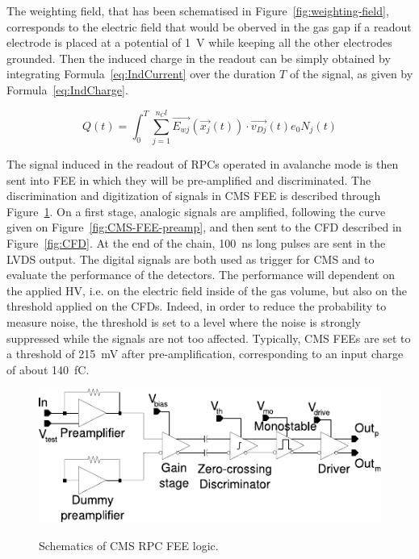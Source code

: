 	The weighting field, that has been schematised in Figure~\ref{fig:weighting-field}, corresponds to the electric field that would be oberved in the gas gap if a readout electrode is placed at a potential of \SI{1}{V} while keeping all the other electrodes grounded. Then the induced charge in the readout can be simply obtained by integrating Formula~\ref{eq:IndCurrent} over the duration $T$ of the signal, as given by Formula~\ref{eq:IndCharge}.
	
	\begin{equation}
	\label{eq:IndCharge}
	Q(t) = \int_0^T \sum_{j=1}^{n_Cl} \overrightarrow{E_{wj}}(\overrightarrow{x_j}(t)) \cdot \overrightarrow{v_{Dj}}(t) e_0 N_j(t)
	\end{equation}
	
	The signal induced in the readout of RPCs operated in avalanche mode is then sent into \acl{FEE} in which they will be pre-amplified and discriminated. The discrimination and digitization of signals in CMS FEE is described through Figure~\ref{fig:CMS-FEE}. On a first stage, analogic signals are amplified, following the curve given on Figure~\ref{fig:CMS-FEE-preamp}, and then sent to the \acf{CFD} described in Figure~\ref{fig:CFD}. At the end of the chain, \SI{100}{ns} long pulses are sent in the LVDS output. The digital signals are both used as trigger for CMS and to evaluate the performance of the detectors. The performance will dependent on the applied HV, i.e. on the electric field inside of the gas volume, but also on the threshold applied on the CFDs. Indeed, in order to reduce the probability to measure noise, the threshold is set to a level where the noise is strongly suppressed while the signals are not too affected. Typically, CMS FEEs are set to a threshold of \SI{215}{mV} after pre-amplification, corresponding to an input charge of about \SI{140}{fC}.
	
	\begin{figure}[H]
		\centering
		\includegraphics[width = 0.6\plotwidth]{fig/chapt4/CMS-FEE.pdf}\\
		\caption{\label{fig:CMS-FEE} Schematics of CMS RPC FEE logic.}
	\end{figure}
	
